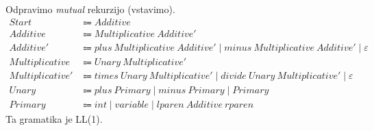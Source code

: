 \documentclass{report}
\newcommand{\Null}{\varepsilon}
\newcommand{\Spc}{\ }
\newcommand{\Union}{\mathrel{|}}
\newcommand{\Arrow}{\Coloneq}
\newcommand{\NT}[1]{{#1}}
\newcommand{\T}[1]{{#1}}
\begin{document}
    Odpravimo \emph{mutual} rekurzijo (vstavimo).
    \begin{align*}
      \NT{Start} &\Arrow \NT{Additive}\\[1em]
      \NT{Additive} &\Arrow \NT{Multiplicative} \Spc \NT{Additive'}\\
      \NT{Additive'} &\Arrow \T{plus} \Spc \NT{Multiplicative} \Spc \NT{Additive'} \Union \T{minus} \Spc \NT{Multiplicative} \Spc \NT{Additive'} \Union \Null\\[1em]
      \NT{Multiplicative} &\Arrow \NT{Unary} \Spc \NT{Multiplicative'}\\
      \NT{Multiplicative'} &\Arrow \T{times} \Spc \NT{Unary} \Spc \NT{Multiplicative'} \Union \T{divide} \Spc \NT{Unary} \Spc \NT{Multiplicative'} \Union \Null\\[1em]
      \NT{Unary} &\Arrow \T{plus} \Spc \NT{Primary} \Union \T{minus} \Spc \NT{Primary} \Union \NT{Primary}\\[1em]
      \NT{Primary} &\Arrow \T{int} \Union \T{variable} \Union \T{lparen} \Spc \NT{Additive} \Spc \T{rparen}
    \end{align*}
    Ta gramatika je LL(1).
\end{document}
